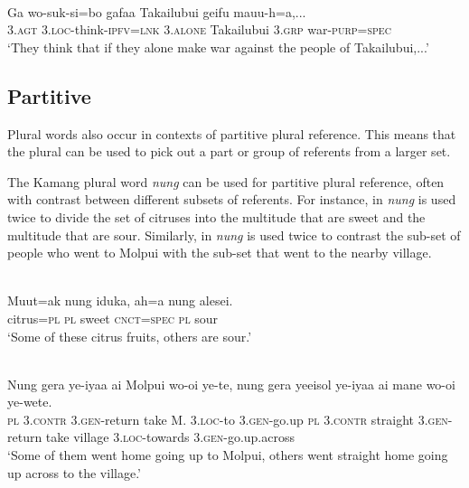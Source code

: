 \ea%
\label{ex:9:83}
 \\
\gll  Ga wo-suk-si=bo gafaa Takailubui geifu {mauu-h=a},...\\
   3.\textsc{agt} \textsc{3.loc-}think\textsc{-ipfv=lnk} 3.\textsc{alone} Takailubui 3.\textsc{grp} war-\textsc{purp}=\textsc{spec} \\
\glt `They think that if they alone make war against the people of Takailubui,...'
\z






\subsection{Partitive} %
\label{sec:9:4.4}
Plural words also occur in contexts of partitive plural reference. This means that the plural can be used to pick out a part or group of referents from a larger set.

The Kamang plural word \textit{nung} can be used for partitive plural reference, often with contrast between different subsets of referents. For instance, in  \textit{nung} is used twice to divide the set of citruses into the multitude that are sweet and the multitude that are sour. Similarly, in  \textit{nung} is used twice to contrast the sub-set of people who went to Molpui with the sub-set that went to the nearby village.


\ea%
\label{ex:9:84}
 \\
\gll  Muut=ak nung iduka, ah=a nung alesei. \\
   citrus=\textsc{pl} \textsc{pl} sweet \textsc{cnct=spec} \textsc{pl} sour  \\
\glt `Some of these citrus fruits, others are sour.'
\z







\ea%
\label{ex:9:85}
 \\
\gll  Nung gera ye-iyaa ai Molpui wo-oi ye-te,  nung gera yeeisol ye-iyaa ai  mane wo-oi ye-wete. \\
    \textsc{pl} \textsc{3.contr} \textsc{3.gen}-return take M. 3.\textsc{loc}-to \textsc{3.gen}-go.up  \textsc{pl} \textsc{3.contr} straight \textsc{3.gen}-return take  village 3.\textsc{loc}-towards \textsc{3.gen}-go.up.across \\
\glt `Some of them went home going up to Molpui, others went straight home going up across to the village.'
\z




